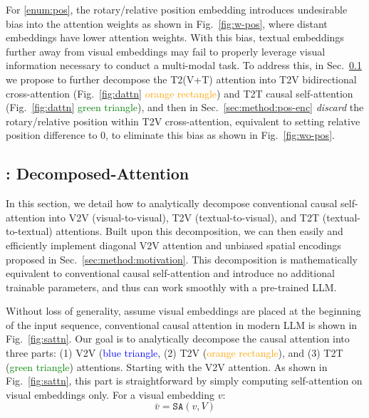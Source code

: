 For \ref{enum:pos}, the rotary/relative position embedding introduces undesirable bias into the attention weights as shown in Fig.~\ref{fig:w-pos}, where distant embeddings have lower attention weights.
With this bias, textual embeddings further away from visual embeddings may fail to properly leverage visual information necessary to conduct a multi-modal task.
To address this, in Sec.~\ref{sec:method:dattn} we propose to further decompose the T2(V+T) attention into T2V bidirectional cross-attention (Fig.~\ref{fig:dattn} \textcolor{orange}{orange rectangle}) and T2T causal self-attention (Fig.~\ref{fig:dattn} \textcolor{green}{green triangle}), and then in Sec.~\ref{sec:method:pos-enc} \emph{discard} the rotary/relative position within T2V cross-attention, equivalent to setting relative position difference to 0, to eliminate this bias as shown in Fig.~\ref{fig:wo-pos}.

\subsection{\method{}: Decomposed-Attention}\label{sec:method:dattn}
In this section, we detail how to analytically decompose conventional causal self-attention into V2V (visual-to-visual), T2V (textual-to-visual), and T2T (textual-to-textual) attentions.
Built upon this decomposition, we can then easily and efficiently implement diagonal V2V attention and unbiased spatial encodings proposed in Sec.~\ref{sec:method:motivation}.
This decomposition is mathematically equivalent to conventional causal self-attention and introduce no additional trainable parameters, and thus can work smoothly with a pre-trained LLM.

Without loss of generality, assume visual embeddings are placed at the beginning of the input sequence, conventional causal attention in modern LLM is shown in Fig.~\ref{fig:sattn}.
Our goal is to analytically decompose the causal attention into three parts: (1) V2V (\textcolor{blue}{blue triangle}, (2) T2V (\textcolor{orange}{orange rectangle}), and (3) T2T (\textcolor{green}{green triangle}) attentions.
Starting with the V2V attention.
As shown in Fig.~\ref{fig:sattn}, this part is straightforward by simply computing self-attention on visual embeddings only.
For a visual embedding $v$:
\begin{equation}
    \bar{v} = \texttt{SA}(v, V)
\end{equation}

